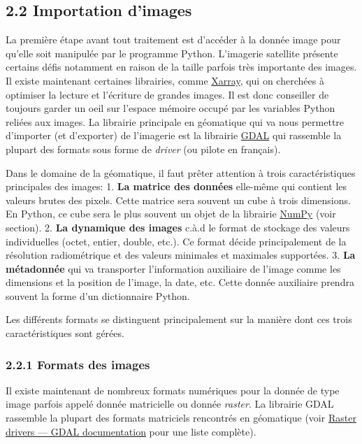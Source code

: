 \subsection{\texorpdfstring{{2.2} Importation
d'images}{2.2 Importation d'images}}\label{importation-dimages}

La première étape avant tout traitement est d'accéder à la donnée image
pour qu'elle soit manipulée par le programme Python. L'imagerie
satellite présente certains défis notamment en raison de la taille
parfois très importante des images. Il existe maintenant certaines
librairies, comme \href{https://docs.xarray.dev/en/stable/}{Xarray}, qui
on cherchées à optimiser la lecture et l'écriture de grandes images. Il
est donc conseiller de toujours garder un oeil sur l'espace mémoire
occupé par les variables Python reliées aux images. La librairie
principale en géomatique qui va nous permettre d'importer (et
d'exporter) de l'imagerie est la librairie \href{https://gdal.org}{GDAL}
qui rassemble la plupart des formats sous forme de \emph{driver} (ou
pilote en français).

Dans le domaine de la géomatique, il faut prêter attention à trois
caractéristiques principales des images: 1. \textbf{La matrice des
données} elle-même qui contient les valeurs brutes des pixels. Cette
matrice sera souvent un cube à trois dimensions. En Python, ce cube sera
le plus souvent un objet de la librairie
\href{https://numpy.org/}{NumPy} (voir section). 2. \textbf{La dynamique
des images} c.à.d le format de stockage des valeurs individuelles
(octet, entier, double, etc.). Ce format décide principalement de la
résolution radiométrique et des valeurs minimales et maximales
supportées. 3. \textbf{La métadonnée} qui va transporter l'information
auxiliaire de l'image comme les dimensions et la position de l'image, la
date, etc. Cette donnée auxiliaire prendra souvent la forme d'un
dictionnaire Python.

Les différents formats se distinguent principalement sur la manière dont
ces trois caractéristiques sont gérées.

\subsubsection{\texorpdfstring{{2.2.1} Formats des
images}{2.2.1 Formats des images}}\label{formats-des-images}

Il existe maintenant de nombreux formats numériques pour la donnée de
type image parfois appelé donnée matricielle ou donnée \emph{raster}. La
librairie GDAL rassemble la plupart des formats matriciels rencontrés en
géomatique (voir
\href{https://gdal.org/en/latest/drivers/raster/index.html}{Raster
drivers --- GDAL documentation} pour une liste complète).

